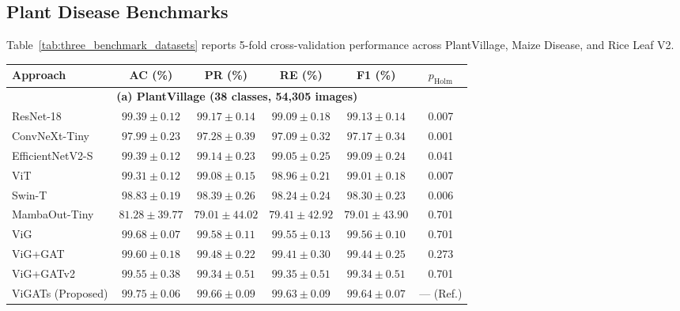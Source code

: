 \documentclass[]{interact}
\theoremstyle{plain}
\theoremstyle{definition}
\theoremstyle{remark}
\newcommand{\bestresult}[1]{\textcolor{bestgreen}{\textbf{#1}}}
\newcommand{\secondresult}[1]{\textcolor{secondorange}{#1}}
\begin{document}
\subsection{Plant Disease Benchmarks}
\label{sec:plant_disease_benchmarks}

Table~\ref{tab:three_benchmark_datasets} reports 5-fold cross-validation performance across PlantVillage, Maize Disease, and Rice Leaf V2.

\begin{table}[H]
\footnotesize
\setlength{\tabcolsep}{3.0pt}
{\begin{tabular}{lccccc} \toprule
\textbf{Approach} & \textbf{AC (\%)} & \textbf{PR (\%)} & \textbf{RE (\%)} & \textbf{F1 (\%)} & \textbf{$p_{\mathrm{Holm}}$} \\ \midrule
\multicolumn{6}{c}{\textbf{(a) PlantVillage (38 classes, 54,305 images)}} \\ \midrule
ResNet-18 \citep{he2016deep} & $99.39 \pm 0.12$ & $99.17 \pm 0.14$ & $99.09 \pm 0.18$ & $99.13 \pm 0.14$ & 0.007 \\
ConvNeXt-Tiny \citep{liu2022convnext} & $97.99 \pm 0.23$ & $97.28 \pm 0.39$ & $97.09 \pm 0.32$ & $97.17 \pm 0.34$ & 0.001 \\
EfficientNetV2-S \citep{tan2021efficientnetv2} & $99.39 \pm 0.12$ & $99.14 \pm 0.23$ & $99.05 \pm 0.25$ & $99.09 \pm 0.24$ & 0.041 \\
ViT \citep{dosovitskiy2020image} & $99.31 \pm 0.12$ & $99.08 \pm 0.15$ & $98.96 \pm 0.21$ & $99.01 \pm 0.18$ & 0.007 \\
Swin-T \citep{liu2021swin} & $98.83 \pm 0.19$ & $98.39 \pm 0.26$ & $98.24 \pm 0.24$ & $98.30 \pm 0.23$ & 0.006 \\
MambaOut-Tiny \citep{yu2024mambaout} & $81.28 \pm 39.77$ & $79.01 \pm 44.02$ & $79.41 \pm 42.92$ & $79.01 \pm 43.90$ & 0.701 \\
ViG \citep{han2022vision} & \secondresult{$99.68 \pm 0.07$} & \secondresult{$99.58 \pm 0.11$} & \secondresult{$99.55 \pm 0.13$} & \secondresult{$99.56 \pm 0.10$} & 0.701 \\
ViG+GAT \citep{velickovic2018graph} & $99.60 \pm 0.18$ & $99.48 \pm 0.22$ & $99.41 \pm 0.30$ & $99.44 \pm 0.25$ & 0.273 \\
ViG+GATv2 \citep{brody2022gat} & $99.55 \pm 0.38$ & $99.34 \pm 0.51$ & $99.35 \pm 0.51$ & $99.34 \pm 0.51$ & 0.701 \\
ViGATs (Proposed) & \bestresult{$99.75 \pm 0.06$} & \bestresult{$99.66 \pm 0.09$} & \bestresult{$99.63 \pm 0.09$} & \bestresult{$99.64 \pm 0.07$} & --- (Ref.) \\

\end{tabular}}
\end{table}
\end{document}

